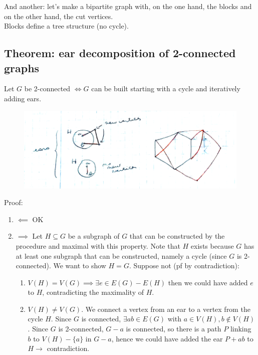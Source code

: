 		And another: let's make a bipartite graph with, on the one hand, the blocks and on the other hand, the cut vertices.\\

                Blocks define a tree structure (no cycle).

		\subsection{Theorem: ear decomposition of 2-connected graphs}
		Let $G$ be 2-connected $\iff G$ can be built starting with a cycle and iteratively adding ears.\\
		
		\begin{figure}
			\center
			\includegraphics{img/3-1}
		\end{figure}
		Proof: 
		\begin{enumerate}
			\item $\impliedby$ OK
			\item $\implies$ Let $H \subseteq G$ be a subgraph of $G$ that can be constructed by the procedure and maximal with this property. Note that $H$ exists because $G$ has at least one subgraph that can be constructed, namely a cycle (since $G$ is 2-connected). We want to show $H = G$. Suppose not (pf by contradiction): 
				\begin{enumerate} 
					\item $V(H) = V(G) \implies \exists e \in E(G) - E(H)$ then we could have added $e$ to $H$, contradicting the maximality of $H$.
					\item $V(H) \neq V(G)$. We connect a vertex from an ear to a vertex from the cycle $H$. Since $G$ is connected, $\exists ab \in E(G)$ with $a \in V(H), b \notin V(H)$. Since $G$ is 2-connected, $G-a$ is connected, so there is a path $P$ linking $b$ to $V(H) - \{a\}$ in $G- a$, hence we could have added the ear $P + ab$ to $H \rightarrow$ contradiction. 
				\end{enumerate}
		\end{enumerate}
		
